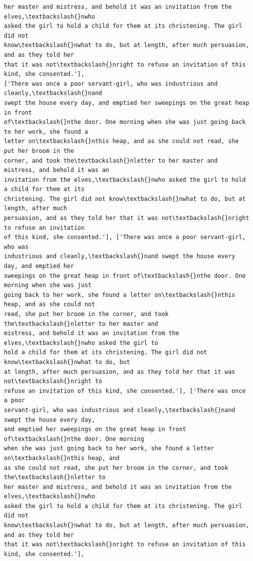\documentclass[11pt]{article}
\begin{document}
\begin{Verbatim}[commandchars=\\\{\}]
her master and mistress, and behold it was an invitation from the elves,\textbackslash{}nwho
asked the girl to hold a child for them at its christening. The girl did not
know\textbackslash{}nwhat to do, but at length, after much persuasion, and as they told her
that it was not\textbackslash{}nright to refuse an invitation of this kind, she consented.'],
['There was once a poor servant-girl, who was industrious and cleanly,\textbackslash{}nand
swept the house every day, and emptied her sweepings on the great heap in front
of\textbackslash{}nthe door. One morning when she was just going back to her work, she found a
letter on\textbackslash{}nthis heap, and as she could not read, she put her broom in the
corner, and took the\textbackslash{}nletter to her master and mistress, and behold it was an
invitation from the elves,\textbackslash{}nwho asked the girl to hold a child for them at its
christening. The girl did not know\textbackslash{}nwhat to do, but at length, after much
persuasion, and as they told her that it was not\textbackslash{}nright to refuse an invitation
of this kind, she consented.'], ['There was once a poor servant-girl, who was
industrious and cleanly,\textbackslash{}nand swept the house every day, and emptied her
sweepings on the great heap in front of\textbackslash{}nthe door. One morning when she was just
going back to her work, she found a letter on\textbackslash{}nthis heap, and as she could not
read, she put her broom in the corner, and took the\textbackslash{}nletter to her master and
mistress, and behold it was an invitation from the elves,\textbackslash{}nwho asked the girl to
hold a child for them at its christening. The girl did not know\textbackslash{}nwhat to do, but
at length, after much persuasion, and as they told her that it was not\textbackslash{}nright to
refuse an invitation of this kind, she consented.'], ['There was once a poor
servant-girl, who was industrious and cleanly,\textbackslash{}nand swept the house every day,
and emptied her sweepings on the great heap in front of\textbackslash{}nthe door. One morning
when she was just going back to her work, she found a letter on\textbackslash{}nthis heap, and
as she could not read, she put her broom in the corner, and took the\textbackslash{}nletter to
her master and mistress, and behold it was an invitation from the elves,\textbackslash{}nwho
asked the girl to hold a child for them at its christening. The girl did not
know\textbackslash{}nwhat to do, but at length, after much persuasion, and as they told her
that it was not\textbackslash{}nright to refuse an invitation of this kind, she consented.'],

\end{Verbatim}
\end{document}
